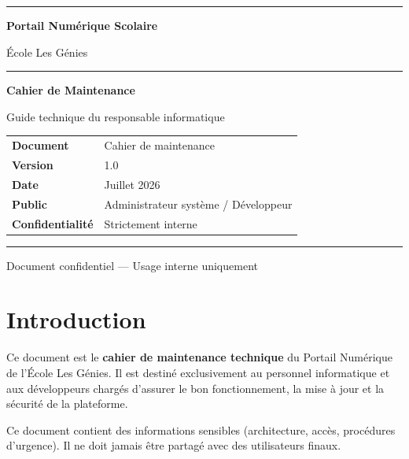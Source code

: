 \documentclass[12pt,a4paper]{report}
\begin{document}
\begin{titlepage}\centering\vspace*{2cm}
  {\color{primary}\rule{\linewidth}{3pt}}\vspace{0.5cm}
  {\Huge\bfseries\color{primary}Portail Numérique Scolaire\par}\vspace{0.3cm}
  {\LARGE\color{gray}École Les Génies\par}\vspace{0.8cm}
  {\color{primary}\rule{\linewidth}{1.5pt}}\vspace{1cm}
  {\huge\bfseries Cahier de Maintenance\par}\vspace{0.4cm}
  {\large Guide technique du responsable informatique\par}\vspace{2cm}
  \begin{tabular}{ll}\toprule
    \textbf{Document}   & Cahier de maintenance \\
    \textbf{Version}    & 1.0 \\
    \textbf{Date}       & Juillet 2026 \\
    \textbf{Public}     & Administrateur système / Développeur \\
    \textbf{Confidentialité} & Strictement interne \\
  \bottomrule\end{tabular}
  \vfill{\color{primary}\rule{\linewidth}{3pt}}
  {\small\color{gray}Document confidentiel — Usage interne uniquement}
\end{titlepage}

\tableofcontents\clearpage

\chapter*{Introduction}

Ce document est le \textbf{cahier de maintenance technique} du Portail Numérique de l'École Les Génies. Il est destiné exclusivement au personnel informatique et aux développeurs chargés d'assurer le bon fonctionnement, la mise à jour et la sécurité de la plateforme.

\begin{dangerbox}
Ce document contient des informations sensibles (architecture, accès, procédures d'urgence). Il ne doit jamais être partagé avec des utilisateurs finaux.
\end{dangerbox}
\end{document}
